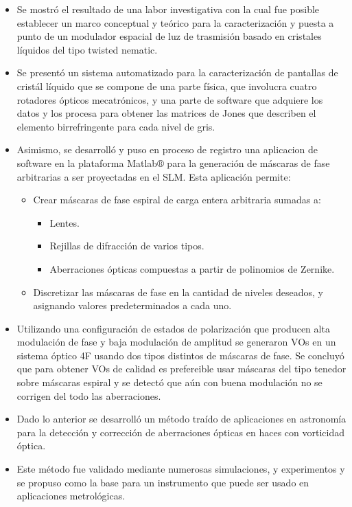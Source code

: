 \begin{itemize}
\item Se mostró el resultado de una labor investigativa con la cual
  fue posible establecer un marco conceptual y teórico para la
  caracterización y puesta a punto de un modulador espacial de luz de
  trasmisión basado en cristales líquidos del tipo twisted nematic. 
\item Se presentó un sistema automatizado para la caracterización de
  pantallas de cristál líquido que se compone de una parte física, que
  involucra cuatro rotadores ópticos mecatrónicos, y una parte de
  software que adquiere los datos y los procesa para obtener las
  matrices de Jones que describen el elemento birrefringente para cada
  nivel de gris. 
\item Asimismo, se desarrolló y puso en proceso de registro una aplicacion de software en la
  plataforma Matlab$\circledR$ para la
  generación de máscaras de fase arbitrarias a ser proyectadas en el
  SLM. Esta aplicación permite:
  \begin{itemize}
    \item Crear máscaras de fase espiral de carga entera arbitraria
      sumadas a:
      \begin{itemize}
        \item Lentes.
        \item Rejillas de difracción de varios tipos.
        \item Aberraciones ópticas compuestas a partir de polinomios
          de Zernike.
      \end{itemize}
    \item Discretizar las máscaras de fase en la cantidad de niveles
      deseados, y asignando valores predeterminados a cada uno. 
  \end{itemize}
 \item Utilizando una configuración de estados de polarización que
   producen alta modulación de fase y baja modulación de amplitud se
   generaron VOs en un sistema óptico 4F usando dos tipos distintos de
   máscaras de fase. Se concluyó que para obtener VOs de calidad es
   prefereible usar máscaras del tipo tenedor sobre máscaras espiral y
   se detectó que aún con buena modulación no se corrigen del todo las aberraciones. 
\item Dado lo anterior se desarrolló un método traído de aplicaciones
  en astronomía para la detección y corrección de aberraciones ópticas en haces con vorticidad óptica.
\item Este método fue validado mediante numerosas simulaciones, y
  experimentos y se propuso como la base para un instrumento que puede
  ser usado en aplicaciones metrológicas. 
\end{itemize}

